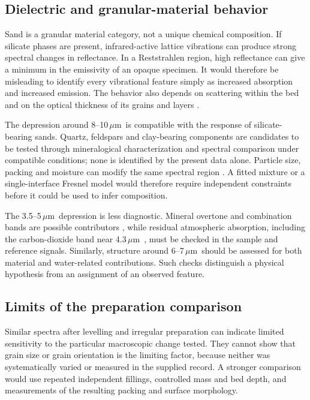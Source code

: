 \documentclass[11pt,a4paper]{article}
\newcommand{\um}{\ensuremath{\,\mu\mathrm{m}}}
\begin{document}
\subsection{Dielectric and granular-material behavior}
Sand is a granular material category, not a unique chemical composition. If silicate phases are present, infrared-active lattice vibrations can produce strong spectral changes in reflectance. In a Reststrahlen region, high reflectance can give a minimum in the emissivity of an opaque specimen. It would therefore be misleading to identify every vibrational feature simply as increased absorption and increased emission. The behavior also depends on scattering within the bed and on the optical thickness of its grains and layers \cite{salisbury1992,hewson2012}.

The depression around 8--10\um\ is compatible with the response of silicate-bearing sands. Quartz, feldspars and clay-bearing components are candidates to be tested through mineralogical characterization and spectral comparison under compatible conditions; none is identified by the present data alone. Particle size, packing and moisture can modify the same spectral region \cite{wald1995,mira2007}. A fitted mixture or a single-interface Fresnel model would therefore require independent constraints before it could be used to infer composition.

The 3.5--5\um\ depression is less diagnostic. Mineral overtone and combination bands are possible contributors \cite{salisbury1994}, while residual atmospheric absorption, including the carbon-dioxide band near 4.3\um\ \cite{brukerVacuum}, must be checked in the sample and reference signals. Similarly, structure around 6--7\um\ should be assessed for both material and water-related contributions. Such checks distinguish a physical hypothesis from an assignment of an observed feature.

\subsection{Limits of the preparation comparison}
Similar spectra after levelling and irregular preparation can indicate limited sensitivity to the particular macroscopic change tested. They cannot show that grain size or grain orientation is the limiting factor, because neither was systematically varied or measured in the supplied record. A stronger comparison would use repeated independent fillings, controlled mass and bed depth, and measurements of the resulting packing and surface morphology.
\end{document}
